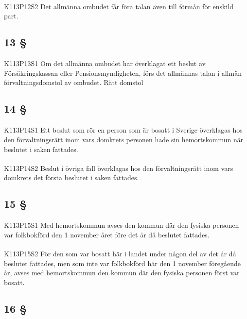 \documentclass[a4paper,notitlepage,openany,10pt]{book}
\begin{document}
\paragraph*{}
{\tiny K113P12S2}
Det allmänna ombudet får föra talan även till förmån för enskild part.
\subsection*{13 §}
\paragraph*{}
{\tiny K113P13S1}
Om det allmänna ombudet har överklagat ett beslut av Försäkringskassan eller Pensionsmyndigheten, förs det allmännas talan i allmän förvaltningsdomstol av ombudet.
Rätt domstol
\subsection*{14 §}
\paragraph*{}
{\tiny K113P14S1}
Ett beslut som rör en person som är bosatt i Sverige överklagas hos den förvaltningsrätt inom vars domkrets personen hade sin hemortskommun när beslutet i saken fattades.
\paragraph*{}
{\tiny K113P14S2}
Beslut i övriga fall överklagas hos den förvaltningsrätt inom vars domkrets det första beslutet i saken fattades.
\subsection*{15 §}
\paragraph*{}
{\tiny K113P15S1}
Med hemortskommun avses den kommun där den fysiska personen var folkbokförd den 1 november året före det år då beslutet fattades.
\paragraph*{}
{\tiny K113P15S2}
För den som var bosatt här i landet under någon del av det år då beslutet fattades, men som inte var folkbokförd här den 1 november föregående år, avses med hemortskommun den kommun där den fysiska personen först var bosatt.
\subsection*{16 §}
\end{document}
